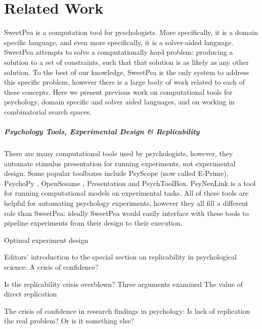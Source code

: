 

\chapter{Related Work}

SweetPea is a computation tool for pyschologists. More specifically, it is a domain specific language, and even more specifically, it is a solver-aided language. SweetPea attempts to solve a computationally hard problem: producing a solution to a set of constraints, such that that solution is as likely as any other solution. To the best of our knowledge, SweetPea is the only system to address this specific problem, however there is a large body of work related to each of these concepts. Here we present previous work on computational tools for psychology, domain specific and solver aided languages, and on working in combinatorial search spaces.

\paragraph*{Psychology Tools, Experimental Design \& Replicability}

There are many computational tools used by psychologists, however, they automate stimulus presentation for running experiments, not experimental design. Some popular toolboxes include PsyScope \cite{cohen1993psyscope} (now called E-Prime), PsychoPy \cite{mathot2012opensesame}, OpenSesame \cite{peirce2009generating}, Presentation and PsychToolBox. PsyNeuLink is a tool for running computational models on experimental tasks. All of these tools are helpful for automating psychology experiments, however they all fill a different role than SweetPea: ideally SweetPea would easily interface with these tools to pipeline experiments from their design to their execution.

Optimal experiment design \cite{myung2009optimal}

Editors’ introduction to the special section on replicability in psychological science: A crisis of confidence? \cite{pashler2012editors}

Is the replicability crisis overblown? Three arguments examined \cite{pashler2012replicability}
The value of direct replication \cite{simons2014value}

The crisis of confidence in research findings in psychology: Is lack of replication the real problem? Or is it something else? \cite{schmidt2016crisis}

